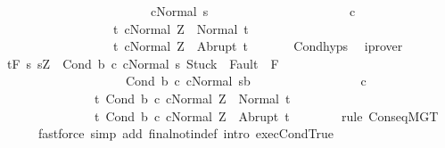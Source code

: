 \begin{isabellebody}
\ \ \ \ \ \ \ \ \ \ \ \ \ \ \ \ \ \ \ \ \ \ \ \ \ {\isasymGamma}{\isasymturnstile}c{}{\isasymdown}Normal\ s{\isacharbraceright}\ \isanewline
\ \ \ \ \ \ \ \ \ \ \ \ \ \ \ \ \ \ \ \ \ c{}\ \isanewline
\ \ \ \ \ \ \ \ \ \ \ \ \ \ \ \ \ \ \ {\isacharbraceleft}t{\isachardot}\ {\isasymGamma}{\isasymturnstile}{\isasymlangle}c{}{\isacharcomma}Normal\ Z{\isasymrangle}\ {\isasymRightarrow}\ Normal\ t{\isacharbraceright}{\isacharcomma}\isanewline
\ \ \ \ \ \ \ \ \ \ \ \ \ \ \ \ \ \ \ {\isacharbraceleft}t{\isachardot}\ {\isasymGamma}{\isasymturnstile}{\isasymlangle}c{}{\isacharcomma}Normal\ Z{\isasymrangle}\ {\isasymRightarrow}\ Abrupt\ t{\isacharbraceright}{\isachardoublequoteclose}\ \isanewline
\ \ \ \ \isamarkupfalse%
\ Cond{\isachardot}hyps\ \isamarkupfalse%
\ iprover\ \ \isanewline
\ \ \isamarkupfalse%
\ {\isachardoublequoteopen}{\isasymGamma}{\isacharcomma}{\isasymTheta}\ {\isasymturnstile}\isactrlsub t\isactrlbsub {\isacharslash}F\isactrlesub \ {\isacharparenleft}{\isacharbraceleft}s{\isachardot}\ s{\isacharequal}Z\ {\isasymand}\ {\isasymGamma}{\isasymturnstile}{\isasymlangle}Cond\ b\ c{}\ c{}{\isacharcomma}Normal\ s{\isasymrangle}\ {\isasymRightarrow}{\isasymnotin}{\isacharparenleft}{\isacharbraceleft}Stuck{\isacharbraceright}\ {\isasymunion}\ Fault\ {\isacharbackquote}\ {\isacharparenleft}{\isacharminus}F{\isacharparenright}{\isacharparenright}\ {\isasymand}\ \isanewline
\ \ \ \ \ \ \ \ \ \ \ \ \ \ \ \ \ \ \ \ \ {\isasymGamma}{\isasymturnstile}{\isacharparenleft}Cond\ b\ c{}\ c{}{\isacharparenright}{\isasymdown}Normal\ s{\isacharbraceright}{\isasyminter}b{\isacharparenright}\ \isanewline
\ \ \ \ \ \ \ \ \ \ \ \ \ \ \ \ c{}\ \isanewline
\ \ \ \ \ \ \ \ \ \ \ \ \ \ \ \ {\isacharbraceleft}t{\isachardot}\ {\isasymGamma}{\isasymturnstile}{\isasymlangle}Cond\ b\ c{}\ c{}{\isacharcomma}Normal\ Z{\isasymrangle}\ {\isasymRightarrow}\ Normal\ t{\isacharbraceright}{\isacharcomma}\isanewline
\ \ \ \ \ \ \ \ \ \ \ \ \ \ \ \ {\isacharbraceleft}t{\isachardot}\ {\isasymGamma}{\isasymturnstile}{\isasymlangle}Cond\ b\ c{}\ c{}{\isacharcomma}Normal\ Z{\isasymrangle}\ {\isasymRightarrow}\ Abrupt\ t{\isacharbraceright}{\isachardoublequoteclose}\ \ \isanewline
\ \ \ \ \isamarkupfalse%
\ {\isacharparenleft}rule\ ConseqMGT{\isacharparenright}\isanewline
\ \ \ \ \ \ \ {\isacharparenleft}fastforce\ simp\ add{\isacharcolon}\ final{\isacharunderscore}notin{\isacharunderscore}def\ intro{\isacharcolon}\ exec{\isachardot}CondTrue\ \isanewline

\end{isabellebody}

